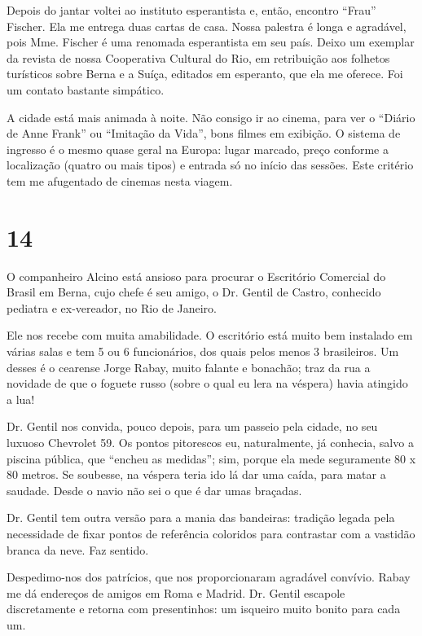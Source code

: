 Depois do jantar voltei ao instituto esperantista e, então, encontro ``Frau'' Fischer. Ela me entrega duas cartas de casa. Nossa palestra é longa e agradável, pois Mme. Fischer é uma renomada esperantista em seu país. Deixo um exemplar da revista de nossa Cooperativa Cultural do Rio, em retribuição aos folhetos turísticos sobre Berna e a Suíça, editados em esperanto, que ela me oferece. Foi um contato bastante simpático.

A cidade está mais animada à noite. Não consigo ir ao cinema, para ver o ``Diário de Anne Frank'' ou ``Imitação da Vida'', bons filmes em exibição. O sistema de ingresso é o mesmo quase geral na Europa: lugar marcado, preço conforme a localização (quatro ou mais tipos) e entrada só no início das sessões. Este critério tem me afugentado de cinemas nesta viagem.

\section*{14 \adfflatleafright {}}
O companheiro Alcino está ansioso para procurar o Escritório Comercial do Brasil em Berna, cujo chefe é seu amigo, o Dr. Gentil de Castro, conhecido pediatra e ex-vereador, no Rio de Janeiro.

Ele nos recebe com muita amabilidade. O escritório está muito bem instalado em várias salas e tem 5 ou 6 funcionários, dos quais pelos menos 3 brasileiros. Um desses é o cearense Jorge Rabay, muito falante e bonachão; traz da rua a novidade de que o foguete russo (sobre o qual eu lera na véspera) havia atingido a lua!

Dr. Gentil nos convida, pouco depois, para um passeio pela cidade, no seu luxuoso Chevrolet 59. Os pontos pitorescos eu, naturalmente, já conhecia, salvo a piscina pública, que ``encheu as medidas''; sim, porque ela mede seguramente 80 x 80 metros. Se soubesse, na véspera teria ido lá dar uma caída, para matar a saudade. Desde o navio não sei o que é dar umas braçadas.

Dr. Gentil tem outra versão para a mania das bandeiras: tradição legada pela necessidade de fixar pontos de referência coloridos para contrastar com a vastidão branca da neve. Faz sentido.

Despedimo-nos dos patrícios, que nos proporcionaram agradável convívio. Rabay me dá endereços de amigos em Roma e Madrid. Dr. Gentil escapole discretamente e retorna com presentinhos: um isqueiro muito bonito para cada um.

